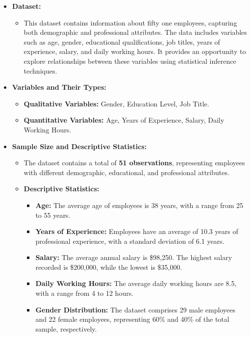 \documentclass[12pt,a4paper]{article}
\begin{document}
\begin{itemize}
    \item \textbf{Dataset:}
    \begin{itemize}
        \item This dataset contains information about fifty one employees, capturing both demographic and professional attributes. The data includes variables such as age, gender, educational qualifications, job titles, years of experience, salary, and daily working hours. It provides an opportunity to explore relationships between these variables using statistical inference techniques.
    \end{itemize}

    \item \textbf{Variables and Their Types:}
    \begin{itemize}
        \item \textbf{Qualitative Variables:} Gender, Education Level, Job Title.
        \item \textbf{Quantitative Variables:} Age, Years of Experience, Salary, Daily Working Hours.
    \end{itemize}

\item \textbf{Sample Size and Descriptive Statistics:}
\begin{itemize}
    \item The dataset contains a total of \textbf{51 observations}, representing employees with different demographic, educational, and professional attributes.
    
    \item \textbf{Descriptive Statistics:}
    \begin{itemize}
        \item \textbf{Age:}
        The average age of employees is 38 years, with a range from 25 to 55 years.
        \item \textbf{Years of Experience:}
        Employees have an average of 10.3 years of professional experience, with a standard deviation of 6.1 years.
        \item \textbf{Salary:}
        The average annual salary is \$98,250. The highest salary recorded is \$200,000, while the lowest is \$35,000.
        \item \textbf{Daily Working Hours:}
        The average daily working hours are 8.5, with a range from 4 to 12 hours.
        \item \textbf{Gender Distribution:}
        The dataset comprises 29 male employees and 22 female employees, representing 60\% and 40\% of the total sample, respectively.
    \end{itemize}
\end{itemize}



\end{itemize}
\end{document}
